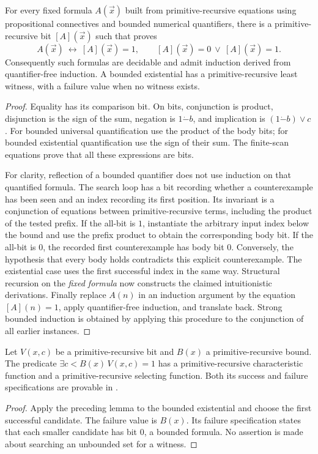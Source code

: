 \begin{lemma}\label{base:boolean}
For every fixed formula $A(\vec x)$ built from primitive-recursive equations
using propositional connectives and bounded numerical quantifiers, there is
a primitive-recursive bit $[A](\vec x)$ such that \ipra{} proves
\[
 A(\vec x)\ \longleftrightarrow\ [A](\vec x)=1,
 \qquad [A](\vec x)=0\ \lor\ [A](\vec x)=1.
\]
Consequently such formulas are decidable and admit induction derived from
quantifier-free induction. A bounded existential has a primitive-recursive
least witness, with a failure value when no witness exists.
\end{lemma}
\begin{proof}
Equality has its comparison bit. On bits, conjunction is product,
disjunction is the sign of the sum, negation is $1\mathbin{\dot-}b$, and
implication is $(1\mathbin{\dot-}b)\lor c$.
For bounded universal quantification use the product of the body bits;
for bounded existential quantification use the sign of their sum.
The finite-scan equations prove that all these expressions are bits.

For clarity, reflection of a bounded quantifier does not use induction on
that quantified formula. The search loop has a bit recording whether a
counterexample has been seen and an index recording its first position.
Its invariant is a conjunction of equations between primitive-recursive
terms, including the product of the tested prefix. If the all-bit is $1$,
instantiate the arbitrary input index below the bound and use the prefix
product to obtain the corresponding body bit. If the all-bit is $0$, the
recorded first counterexample has body bit $0$. Conversely, the hypothesis
that every body holds contradicts this explicit counterexample. The
existential case uses the first successful index in the same way.
Structural recursion on the \emph{fixed formula} now constructs the claimed
intuitionistic derivations. Finally replace $A(n)$ in an induction argument
by the equation $[A](n)=1$, apply quantifier-free induction, and translate
back. Strong bounded induction is obtained by applying this procedure to
the conjunction of all earlier instances.
\end{proof}

\begin{lemma}\label{base:selection}
Let $V(x,c)$ be a primitive-recursive bit and $B(x)$ a
primitive-recursive bound. The predicate
$\exists c<B(x)\,V(x,c)=1$ has a primitive-recursive characteristic
function and a primitive-recursive selecting function. Both its success
and failure specifications are provable in \ipra.
\end{lemma}
\begin{proof}
Apply the preceding lemma to the bounded existential and choose the first
successful candidate. The failure value is $B(x)$. Its failure specification
states that each smaller candidate has bit $0$, a bounded formula. No
assertion is made about searching an unbounded set for a witness.
\end{proof}

